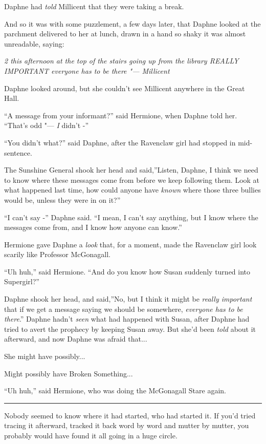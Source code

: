 Daphne had \emph{told} Millicent that they were taking a break.

And so it was with some puzzlement, a few days later, that Daphne looked
at the parchment delivered to her at lunch, drawn in a hand so shaky it
was almost unreadable, saying:

\emph{2 this afternoon at the top of the stairs going up from the
library REALLY IMPORTANT everyone has to be there "--- Millicent}

Daphne looked around, but she couldn't see Millicent anywhere in the
Great Hall.

``A message from your informant?'' said Hermione, when Daphne told her.
``That's odd "--- \emph{I} didn't -''

``You didn't what?'' said Daphne, after the Ravenclaw girl had stopped
in mid-sentence.

The Sunshine General shook her head and said,''Listen, Daphne, I think
we need to know where these messages come from before we keep following
them. Look at what happened last time, how could anyone have
\emph{known} where those three bullies would be, unless they were in on
it?''

``I can't say -'' Daphne said. ``I mean, I can't say anything, but I
know where the messages come from, and I know how anyone can know.''

Hermione gave Daphne a \emph{look} that, for a moment, made the
Ravenclaw girl look scarily like Professor McGonagall.

``Uh huh,'' said Hermione. ``And do you know how Susan suddenly turned
into Supergirl?''

Daphne shook her head, and said,''No, but I think it might be
\emph{really important} that if we get a message saying we should be
somewhere, \emph{everyone has to be there}.'' Daphne hadn't \emph{seen}
what had happened with Susan, after Daphne had tried to avert the
prophecy by keeping Susan away. But she'd been \emph{told} about it
afterward, and now Daphne was afraid that...

She might have possibly...

Might possibly have Broken Something...

``Uh huh,'' said Hermione, who was doing the McGonagall Stare again.

\begin{center}\rule{3in}{0.4pt}\end{center}

Nobody seemed to know where it had started, who had started it. If you'd
tried tracing it afterward, tracked it back word by word and mutter by
mutter, you probably would have found it all going in a huge circle.


